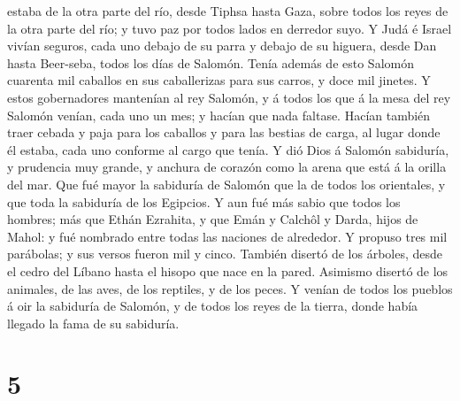 estaba de la otra parte del río, desde Tiphsa hasta Gaza, sobre todos
los reyes de la otra parte del río; y tuvo paz por todos lados en
derredor suyo.  Y Judá é Israel vivían seguros, cada uno
debajo de su parra y debajo de su higuera, desde Dan hasta Beer-seba,
todos los días de Salomón.  Tenía además de esto Salomón
cuarenta mil caballos en sus caballerizas para sus carros, y doce mil
jinetes.  Y estos gobernadores mantenían al rey Salomón, y
á todos los que á la mesa del rey Salomón venían, cada uno un mes; y
hacían que nada faltase.  Hacían también traer cebada y
paja para los caballos y para las bestias de carga, al lugar donde él
estaba, cada uno conforme al cargo que tenía.  Y dió Dios á
Salomón sabiduría, y prudencia muy grande, y anchura de corazón como la
arena que está á la orilla del mar.  Que fué mayor la
sabiduría de Salomón que la de todos los orientales, y que toda la
sabiduría de los Egipcios.  Y aun fué más sabio que todos
los hombres; más que Ethán Ezrahita, y que Emán y Calchôl y Darda, hijos
de Mahol: y fué nombrado entre todas las naciones de alrededor.
 Y propuso tres mil parábolas; y sus versos fueron mil y
cinco.  También disertó de los árboles, desde el cedro del
Líbano hasta el hisopo que nace en la pared. Asimismo disertó de los
animales, de las aves, de los reptiles, y de los peces.  Y
venían de todos los pueblos á oir la sabiduría de Salomón, y de todos
los reyes de la tierra, donde había llegado la fama de su sabiduría.

\hypertarget{section-4}{%
\section{5}\label{section-4}}

